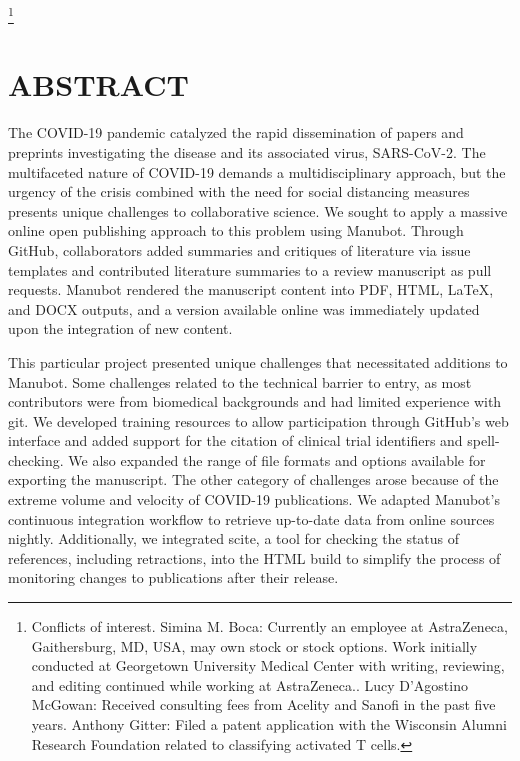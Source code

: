 \documentclass[twocolumn]{ceurart}
\begin{document}


\maketitle

{\let\thefootnote\relax\footnote{Conflicts of interest. Simina M. Boca: Currently an employee at AstraZeneca, Gaithersburg, MD, USA, may own stock or stock options. Work initially conducted at Georgetown University Medical Center with writing, reviewing, and editing continued while working at AstraZeneca.. Lucy D'Agostino McGowan: Received consulting fees from Acelity and Sanofi in the past five years. Anthony Gitter: Filed a patent application with the Wisconsin Alumni Research Foundation related to classifying activated T cells.}}

\hypertarget{abstract}{%
\section{ABSTRACT}\label{abstract}}

The COVID-19 pandemic catalyzed the rapid dissemination of papers and preprints investigating the disease and its associated virus, SARS-CoV-2.
The multifaceted nature of COVID-19 demands a multidisciplinary approach, but the urgency of the crisis combined with the need for social distancing measures presents unique challenges to collaborative science.
We sought to apply a massive online open publishing approach to this problem using Manubot.
Through GitHub, collaborators added summaries and critiques of literature via issue templates and contributed literature summaries to a review manuscript as pull requests.
Manubot rendered the manuscript content into PDF, HTML, LaTeX, and DOCX outputs, and a version available online was immediately updated upon the integration of new content.

This particular project presented unique challenges that necessitated additions to Manubot.
Some challenges related to the technical barrier to entry, as most contributors were from biomedical backgrounds and had limited experience with git.
We developed training resources to allow participation through GitHub's web interface and added support for the citation of clinical trial identifiers and spell-checking.
We also expanded the range of file formats and options available for exporting the manuscript.
The other category of challenges arose because of the extreme volume and velocity of COVID-19 publications.
We adapted Manubot's continuous integration workflow to retrieve up-to-date data from online sources nightly.
Additionally, we integrated scite, a tool for checking the status of references, including retractions, into the HTML build to simplify the process of monitoring changes to publications after their release.
\end{document}
